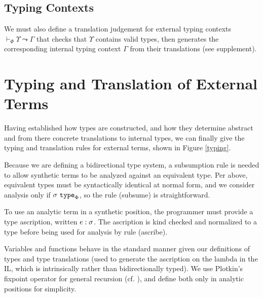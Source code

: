 \documentclass[10pt,preprint]{sigplanconf}
\begin{document}
\subsection{Typing Contexts}
We must also define a translation judgement for external typing contexts $\vdash_\Phi \Upsilon \leadsto \Gamma$ that checks that $\Upsilon$ contains valid types, then generates the corresponding internal typing context $\Gamma$ from their translations (see supplement).
\section{Typing and Translation of External Terms}\label{external-terms}
Having established how types are constructed, and how they determine abstract and from there concrete translations to internal types, we can finally give the typing and translation rules for external terms, shown in Figure \ref{typing}.

Because we are defining a bidirectional type system, a subsumption rule is needed to allow synthetic terms to be analyzed against an equivalent type. Per above, equivalent types must be  syntactically identical at normal form, and we consider analysis only if $\sigma~\texttt{type}_{\Phi}$, so the rule (subsume) is straightforward.

To use an analytic term in a synthetic position, the programmer must provide a type ascription, written $e : \sigma$. The ascription is kind checked and normalized to a type before being used for analysis by rule (ascribe).

Variables and functions behave in the standard manner given our definitions of types and type translations (used to generate the ascription on the lambda in the IL, which is intrinsically rather than bidirectionally typed). We use Plotkin's fixpoint operator for general recursion (cf. \cite{pfpl}), and define both only in analytic positions for simplicity.
\end{document}
